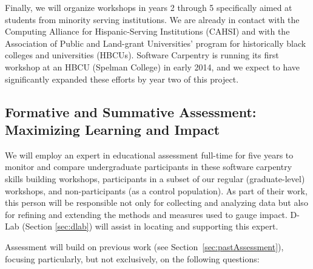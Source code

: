 \documentclass{proposalnsf}
\newlength{\up}
\begin{document}
Finally, we will organize workshops in years 2 through 5 specifically aimed at students from minority serving institutions.
We are already in contact with the Computing Alliance for
Hispanic-Serving Institutions (CAHSI) and with the Association of
Public and Land-grant Universities' program for historically black
colleges and universities (HBCUs). Software Carpentry is running its
first workshop at an HBCU (Spelman College) in early 2014, and we expect to
have significantly expanded these efforts by year two of this project.


\subsection{Formative and Summative Assessment: Maximizing Learning and Impact}

We will employ an expert in educational assessment full-time for five
years to monitor and compare undergraduate participants in these
software carpentry skills building workshops, participants in a subset
of our regular (graduate-level) workshops, and non-participants (as a
control population).  As part of their work, this person will be
responsible not only for collecting and analyzing data but also for
refining and extending the methods and measures used to gauge impact. D-Lab (Section \ref{sec:dlab}) will assist in locating and supporting this expert.

Assessment will build on previous work (see Section~\ref{sec:pastAssessment}), focusing particularly, but not exclusively, on the following questions:
\end{document}
